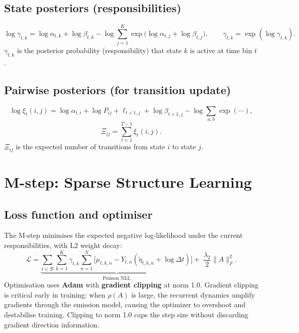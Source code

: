\documentclass[11pt]{article}
\begin{document}
\subsection{State posteriors (responsibilities)}
\begin{equation}
  \log\gamma_{t,k} = \log\alpha_{t,k}+\log\beta_{t,k}
    - \log\sum_{j=1}^K\exp\!\bigl(\log\alpha_{t,j}+\log\beta_{t,j}\bigr),
  \qquad
  \gamma_{t,k} = \exp(\log\gamma_{t,k}).
\end{equation}
$\gamma_{t,k}$ is the posterior probability (responsibility) that state $k$ is active
at time bin $t$.

\subsection{Pairwise posteriors (for transition update)}
\begin{equation}
  \log\xi_t(i,j) = \log\alpha_{t,i}+\log P_{ij}+\ell_{t+1,j}+\log\beta_{t+1,j}
    - \log\sum_{a,b}\exp(\cdots),
\end{equation}
\begin{equation}
  \Xi_{ij} = \sum_{t=1}^{T-1}\xi_t(i,j).
\end{equation}
$\Xi_{ij}$ is the expected number of transitions from state $i$ to state $j$.

\section{M-step: Sparse Structure Learning}

\subsection{Loss function and optimiser}
The M-step minimises the expected negative log-likelihood under the current
responsibilities, with L2 weight decay:
\begin{equation}
  \mathcal{L} =
  \underbrace{\sum_{t\in\mathcal{B}}\sum_{k=1}^K\gamma_{t,k}
    \sum_{n=1}^N\!\bigl[\mu_{t,k,n}-Y_{t,n}(\tilde\eta_{t,k,n}+\log\Delta t)\bigr]}%
  _{\text{Poisson NLL}}
  +\;\frac{\lambda_2}{2}\|A\|_F^2.
\end{equation}
Optimisation uses \textbf{Adam} with \textbf{gradient clipping} at norm 1.0.
Gradient clipping is critical early in training: when $\rho(A)$ is large, the
recurrent dynamics amplify gradients through the emission model, causing the
optimizer to overshoot and destabilise training.  Clipping to norm 1.0 caps the
step size without discarding gradient direction information.
\end{document}
